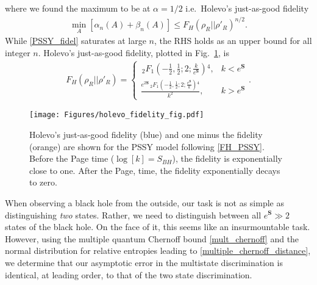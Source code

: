 \documentclass[a4paper,11pt]{article}
\newcommand*{\JKF}[1]{\textcolor{blue}{[JKF: #1]}}
\newcommand*{\SR}[1]{\textcolor{magenta}{[SR: \textsf{#1}]}}
\begin{document}
where we found the maximum to be at $\alpha = 1/2$ i.e.~Holevo's just-as-good fidelity
\begin{align}
    \min_{A}\left[ \alpha_n(A) + \beta_n(A) \right] \leq 
    {
    F_H(\rho_R || \rho'_R)^{n/2}.
    }
    \label{PSSY_fidel}
\end{align}
While \eqref{PSSY_fidel} saturates at large $n$, the RHS holds as an upper bound for all integer $n$.
Holevo's just-as-good fidelity, plotted in Fig.~\ref{holevo_fidelity_fig}, is
\begin{align}
        {
    F_H(\rho_R || \rho'_R)
    }
    = \begin{cases}
     \, _2F_1\left(-\frac{1}{2},\frac{1}{2};2;\frac{k}{e^\textbf{S}}\right){}^4, & k < e^{\textbf{S}}
   \\
   \frac{e^{2\textbf{S}} \,
   _2F_1\left(-\frac{1}{2},\frac{1}{2};2;\frac{e^\textbf{S}}{k}\right){}^4}{k^2}, & k > e^{\textbf{S}}
    \end{cases}.
    \label{FH_PSSY}
\end{align}

\begin{figure}
    \centering
    \texttt{[image: Figures/holevo\_fidelity\_fig.pdf]}
    \caption{Holevo's just-as-good fidelity (blue) and one minus the fidelity (orange) are shown for the PSSY model following \eqref{FH_PSSY}. Before the Page time ($\log \left[k\right] = S_{BH}$), the fidelity is exponentially close to one. After the Page, time, the fidelity exponentially decays to zero.
    }
    \label{holevo_fidelity_fig}
\end{figure}
When observing a black hole from the outside, our task is not as simple as distinguishing \textit{two} states. Rather, we need to distinguish between all $e^\textbf{S}\gg 2$ states of the black hole. On the face of it, this seems like an insurmountable task. However, using the multiple quantum Chernoff bound \eqref{mult_chernoff} and the normal distribution for relative entropies leading to \eqref{multiple_chernoff_distance}, we determine that our asymptotic error in the multistate discrimination is identical, at leading order, to that of the two state discrimination.
\end{document}
